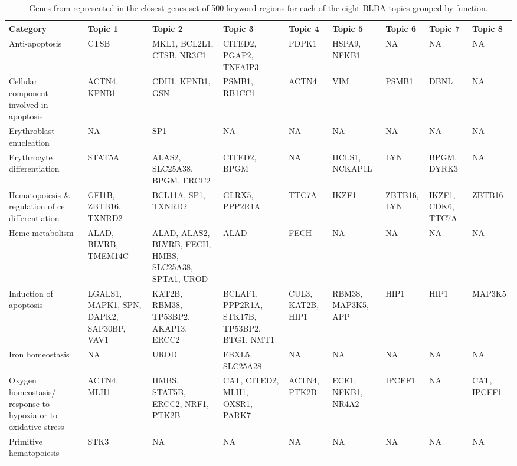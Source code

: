 \clearpage%
\begin{landscape}

  \begin{table}
    \tiny
\begin{tabularx}{\hsize}{|X|X|X|X|X|X|X|X|X|}
  
  \toprule
Category & Topic  1 & Topic  2 & Topic  3 & Topic  4 & Topic  5 & Topic  6 & Topic  7 & Topic  8\\
\midrule
Anti-apoptosis & CTSB & MKL1, BCL2L1, CTSB, NR3C1 & CITED2, PGAP2, TNFAIP3 & PDPK1 & HSPA9, NFKB1 & NA & NA & NA\\
Cellular component involved in apoptosis & ACTN4, KPNB1 & CDH1, KPNB1, GSN & PSMB1, RB1CC1 & ACTN4 & VIM & PSMB1 & DBNL & NA\\
Erythroblast enucleation & NA & SP1 & NA & NA & NA & NA & NA & NA\\
Erythrocyte differentiation & STAT5A & ALAS2, SLC25A38, BPGM, ERCC2 & CITED2, BPGM & NA & HCLS1, NCKAP1L & LYN & BPGM, DYRK3 & NA\\
Hematopoiesis \& regulation of cell differentiation & GFI1B, ZBTB16, TXNRD2 & BCL11A, SP1, TXNRD2 & GLRX5, PPP2R1A & TTC7A & IKZF1 & ZBTB16, LYN & IKZF1, CDK6, TTC7A & ZBTB16\\
Heme metabolism & ALAD, BLVRB, TMEM14C & ALAD, ALAS2, BLVRB, FECH, HMBS, SLC25A38, SPTA1, UROD & ALAD & FECH & NA & NA & NA & NA\\
Induction of apoptosis & LGALS1, MAPK1, SPN, DAPK2, SAP30BP, VAV1 & KAT2B, RBM38, TP53BP2, AKAP13, ERCC2 & BCLAF1, PPP2R1A, STK17B, TP53BP2, BTG1, NMT1 & CUL3, KAT2B, HIP1 & RBM38, MAP3K5, APP & HIP1 & HIP1 & MAP3K5\\
Iron homeostasis & NA & UROD & FBXL5, SLC25A28 & NA & NA & NA & NA & NA\\
Oxygen homeostasis/ response to hypoxia or to oxidative stress & ACTN4, MLH1 & HMBS, STAT5B, ERCC2, NRF1, PTK2B & CAT, CITED2, MLH1, OXSR1, PARK7 & ACTN4, PTK2B & ECE1, NFKB1, NR4A2 & IPCEF1 & NA & CAT, IPCEF1\\
Primitive hematopoiesis & STK3 & NA & NA & NA & NA & NA & NA & NA\\
\bottomrule
  \end{tabularx}

  \caption{Genes from \textcite{Mello2019} represented in the closest genes set of 500 keyword regions for each of the eight BLDA topics grouped by function.}
  \label{table:mello_genes}
\end{table}
\end{landscape}
\clearpage%


